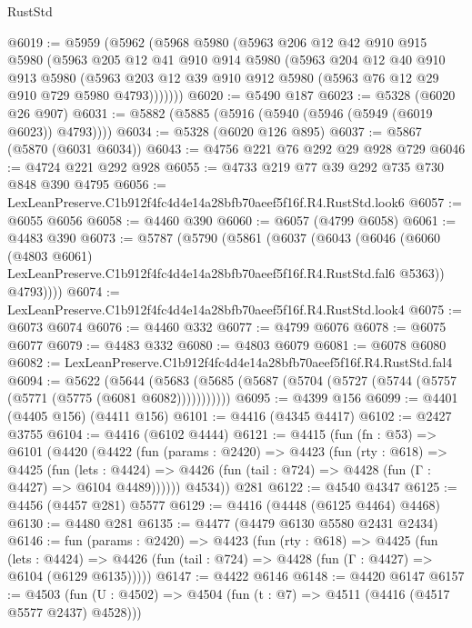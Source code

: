 \begin{lexlean}{RustStd}
\begin{coremodule}
@6019 := @5959
    (@5962
      (@5968
        @5980
        (@5963
          @206
          @12
          @42
          @910
          @915
          @5980
          (@5963
            @205
            @12
            @41
            @910
            @914
            @5980
            (@5963
              @204
              @12
              @40
              @910
              @913
              @5980
              (@5963 @203 @12 @39 @910 @912 @5980 (@5963 @76 @12 @29 @910 @729 @5980 @4793)))))))
@6020 := @5490 @187
@6023 := @5328 (@6020 @26 @907)
@6031 := @5882 (@5885 (@5916 (@5940 (@5946 (@5949 (@6019 @6023)) @4793))))
@6034 := @5328 (@6020 @126 @895)
@6037 := @5867 (@5870 (@6031 @6034))
@6043 := @4756 @221 @76 @292 @29 @928 @729
@6046 := @4724 @221 @292 @928
@6055 := @4733 @219 @77 @39 @292 @735 @730 @848 @390 @4795
@6056 := LexLeanPreserve.C1b912f4fc4d4e14a28bfb70aeef5f16f.R4.RustStd.look6
@6057 := @6055 @6056
@6058 := @4460 @390
@6060 := @6057 (@4799 @6058)
@6061 := @4483 @390
@6073 := @5787
    (@5790
      (@5861
        (@6037
          (@6043
            (@6046
              (@6060
                (@4803 @6061)
                LexLeanPreserve.C1b912f4fc4d4e14a28bfb70aeef5f16f.R4.RustStd.fal6
                @5363))
            @4793))))
@6074 := LexLeanPreserve.C1b912f4fc4d4e14a28bfb70aeef5f16f.R4.RustStd.look4
@6075 := @6073 @6074
@6076 := @4460 @332
@6077 := @4799 @6076
@6078 := @6075 @6077
@6079 := @4483 @332
@6080 := @4803 @6079
@6081 := @6078 @6080
@6082 := LexLeanPreserve.C1b912f4fc4d4e14a28bfb70aeef5f16f.R4.RustStd.fal4
@6094 := @5622
    (@5644 (@5683 (@5685 (@5687 (@5704 (@5727 (@5744 (@5757 (@5771 (@5775 (@6081 @6082)))))))))))
@6095 := @4399 @156
@6099 := @4401 (@4405 @156) (@4411 @156)
@6101 := @4416 (@4345 @4417)
@6102 := @2427 @3755
@6104 := @4416 (@6102 @4444)
@6121 := @4415
    (fun (fn : @53) =>
    @6101
      (@4420
        (@4422
          (fun (params : @2420) =>
          @4423
            (fun (rty : @618) =>
            @4425
              (fun (lets : @4424) =>
              @4426 (fun (tail : @724) => @4428 (fun (Γ : @4427) => @6104 @4489))))))
        @4534))
    @281
@6122 := @4540 @4347
@6125 := @4456 (@4457 @281) @5577
@6129 := @4416 (@4448 (@6125 @4464) @4468)
@6130 := @4480 @281
@6135 := @4477 (@4479 @6130 @5580 @2431 @2434)
@6146 := fun (params : @2420) =>
  @4423
    (fun (rty : @618) =>
    @4425
      (fun (lets : @4424) =>
      @4426 (fun (tail : @724) => @4428 (fun (Γ : @4427) => @6104 (@6129 @6135)))))
@6147 := @4422 @6146
@6148 := @4420 @6147
@6157 := @4503 (fun (U : @4502) => @4504 (fun (t : @7) => @4511 (@4416 (@4517 @5577 @2437) @4528)))

\end{coremodule}
\end{lexlean}
